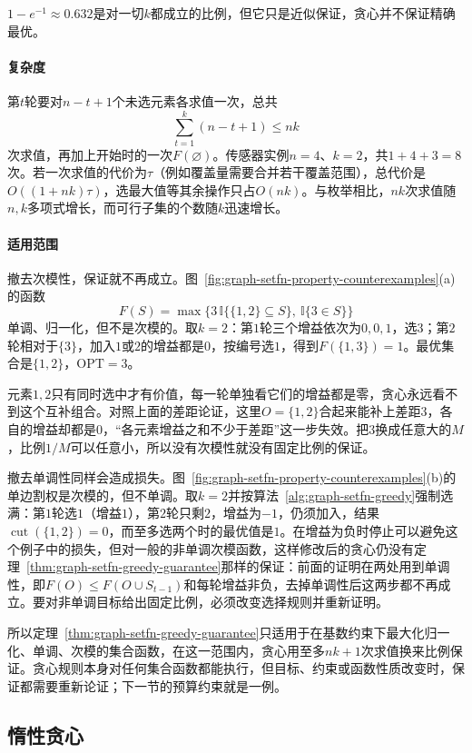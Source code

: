 $1-e^{-1}\approx0.632$是对一切$k$都成立的比例，但它只是近似保证，贪心并不保证精确最优。

\paragraph{复杂度}
第$t$轮要对$n-t+1$个未选元素各求值一次，总共
\[
  \sum_{t=1}^{k}(n-t+1)\leq nk
\]
次求值，再加上开始时的一次$F(\varnothing)$。传感器实例$n=4$、$k=2$，共$1+4+3=8$次。若一次求值的代价为$\tau$（例如覆盖量需要合并若干覆盖范围），总代价是$O((1+nk)\tau)$，选最大值等其余操作只占$O(nk)$。与枚举相比，$nk$次求值随$n,k$多项式增长，而可行子集的个数随$k$迅速增长。

\paragraph{适用范围}
撤去次模性，保证就不再成立。图~\ref{fig:graph-setfn-property-counterexamples}(a)的函数
\[
  F(S)=\max\bigl\{3\,\mathbb I\{\{1,2\}\subseteq S\},\ \mathbb I\{3\in S\}\bigr\}
\]
单调、归一化，但不是次模的。取$k=2$：第$1$轮三个增益依次为$0,0,1$，选$3$；第$2$轮相对于$\{3\}$，加入$1$或$2$的增益都是$0$，按编号选$1$，得到$F(\{1,3\})=1$。最优集合是$\{1,2\}$，$\mathrm{OPT}=3$。

元素$1,2$只有同时选中才有价值，每一轮单独看它们的增益都是零，贪心永远看不到这个互补组合。对照上面的差距论证，这里$O=\{1,2\}$合起来能补上差距$3$，各自的增益却都是$0$，“各元素增益之和不少于差距”这一步失效。把$3$换成任意大的$M$，比例$1/M$可以任意小，所以没有次模性就没有固定比例的保证。

撤去单调性同样会造成损失。图~\ref{fig:graph-setfn-property-counterexamples}(b)的单边割权是次模的，但不单调。取$k=2$并按算法~\ref{alg:graph-setfn-greedy}强制选满：第$1$轮选$1$（增益$1$），第$2$轮只剩$2$，增益为$-1$，仍须加入，结果$\operatorname{cut}(\{1,2\})=0$，而至多选两个时的最优值是$1$。在增益为负时停止可以避免这个例子中的损失，但对一般的非单调次模函数，这样修改后的贪心仍没有定理~\ref{thm:graph-setfn-greedy-guarantee}那样的保证：前面的证明在两处用到单调性，即$F(O)\leq F(O\cup S_{t-1})$和每轮增益非负，去掉单调性后这两步都不再成立。要对非单调目标给出固定比例，必须改变选择规则并重新证明。

所以定理~\ref{thm:graph-setfn-greedy-guarantee}只适用于在基数约束下最大化归一化、单调、次模的集合函数，在这一范围内，贪心用至多$nk+1$次求值换来比例保证。贪心规则本身对任何集合函数都能执行，但目标、约束或函数性质改变时，保证都需要重新论证；下一节的预算约束就是一例。

\subsection{惰性贪心}
\label{sec:graph-setfn-lazy-greedy}

